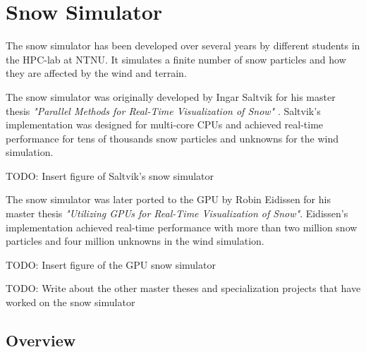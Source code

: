 \section{Snow Simulator}

The snow simulator has been developed over several years by different students in 
the HPC-lab at NTNU. It simulates a finite number of snow particles and how they 
are affected by the wind and terrain. 

The snow simulator was originally developed  by Ingar Saltvik for his master
thesis \emph{"Parallel Methods for Real-Time  Visualization of Snow"}
\cite{originalSnowThesis}. Saltvik's implementation was  designed for multi-core
CPUs and achieved real-time performance for tens of  thousands snow particles
and unknowns for the wind simulation.

TODO: Insert figure of Saltvik's snow simulator

The snow simulator was later ported to the GPU by Robin Eidissen for his master 
thesis \emph{"Utilizing GPUs for Real-Time Visualization of Snow"}\cite{gpuSnowThesis}.
Eidissen's implementation achieved real-time performance with more than two million 
snow particles and four million unknowns in the wind simulation. 

TODO: Insert figure of the GPU snow simulator

TODO: Write about the other master theses and specialization projects that 
have worked on the snow simulator

%

\subsection{Overview}

